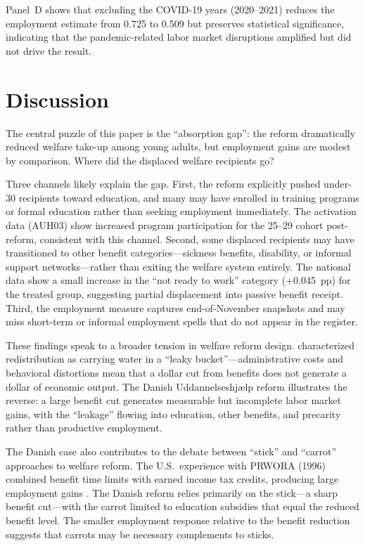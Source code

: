 \documentclass[12pt]{article}
\begin{document}
Panel~D shows that excluding the COVID-19 years (2020--2021) reduces the employment estimate from 0.725 to 0.509 but preserves statistical significance, indicating that the pandemic-related labor market disruptions amplified but did not drive the result.

\section{Discussion}

The central puzzle of this paper is the ``absorption gap'': the reform dramatically reduced welfare take-up among young adults, but employment gains are modest by comparison. Where did the displaced welfare recipients go?

Three channels likely explain the gap. First, the reform explicitly pushed under-30 recipients toward education, and many may have enrolled in training programs or formal education rather than seeking employment immediately. The activation data (AUH03) show increased program participation for the 25--29 cohort post-reform, consistent with this channel. Second, some displaced recipients may have transitioned to other benefit categories---sickness benefits, disability, or informal support networks---rather than exiting the welfare system entirely. The national data show a small increase in the ``not ready to work'' category (+0.045~pp) for the treated group, suggesting partial displacement into passive benefit receipt. Third, the employment measure captures end-of-November snapshots and may miss short-term or informal employment spells that do not appear in the register.

These findings speak to a broader tension in welfare reform design. \citet{okun1975} characterized redistribution as carrying water in a ``leaky bucket''---administrative costs and behavioral distortions mean that a dollar cut from benefits does not generate a dollar of economic output. The Danish Uddannelseshjælp reform illustrates the reverse: a large benefit cut generates measurable but incomplete labor market gains, with the ``leakage'' flowing into education, other benefits, and precarity rather than productive employment.

The Danish case also contributes to the debate between ``stick'' and ``carrot'' approaches to welfare reform. The U.S.\ experience with PRWORA (1996) combined benefit time limits with earned income tax credits, producing large employment gains \citep{blank2002,meyer2002}. The Danish reform relies primarily on the stick---a sharp benefit cut---with the carrot limited to education subsidies that equal the reduced benefit level. The smaller employment response relative to the benefit reduction suggests that carrots may be necessary complements to sticks.
\end{document}

